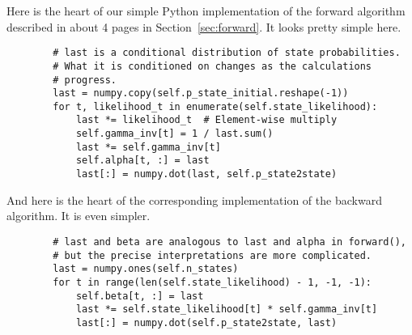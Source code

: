 Here is the heart of our simple Python implementation of the forward
algorithm described in about 4 pages in Section~\ref{sec:forward}.  It
looks pretty simple here.
\label{code:forward}
\begin{verbatim}
        # last is a conditional distribution of state probabilities.
        # What it is conditioned on changes as the calculations
        # progress.
        last = numpy.copy(self.p_state_initial.reshape(-1))
        for t, likelihood_t in enumerate(self.state_likelihood):
            last *= likelihood_t  # Element-wise multiply
            self.gamma_inv[t] = 1 / last.sum()
            last *= self.gamma_inv[t]
            self.alpha[t, :] = last
            last[:] = numpy.dot(last, self.p_state2state)
\end{verbatim}
And here is the heart of the corresponding implementation of the
backward algorithm.  It is even simpler.
\label{code:backward}
\begin{verbatim}
        # last and beta are analogous to last and alpha in forward(),
        # but the precise interpretations are more complicated.
        last = numpy.ones(self.n_states)
        for t in range(len(self.state_likelihood) - 1, -1, -1):
            self.beta[t, :] = last
            last *= self.state_likelihood[t] * self.gamma_inv[t]
            last[:] = numpy.dot(self.p_state2state, last)
\end{verbatim}



